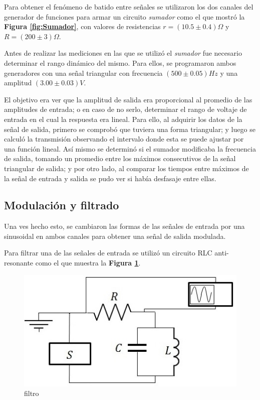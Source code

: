 \documentclass[11pt,a4paper]{article}
\begin{document}
Para obtener el fenómeno de batido entre señales se utilizaron los dos canales del generador de funciones para armar un circuito \textit{sumador} como el que mostró la \textbf{Figura \ref{fig:Sumador}}, con valores de resistencias $r=(10.5 \pm 0.4)\Omega$ y $R=(200 \pm 3)\Omega$.

Antes de realizar las mediciones en las que se utilizó el \textit{sumador} fue necesario determinar el rango dinámico del mismo. Para ellos, se programaron ambos generadores con una señal triangular con frecuencia $(500 \pm 0.05) Hz$ y una amplitud $(3.00 \pm 0.03)V$.

El objetivo era ver que la amplitud de salida era proporcional al promedio de las amplitudes de entrada; o en caso de no serlo, determinar el rango de voltaje de entrada en el cual la respuesta era lineal. Para ello, al adquirir los datos de la señal de salida, primero se comprobó que tuviera una forma triangular; y luego se calculó la transmisión observando el intervalo donde esta se puede ajustar por una función lineal. Así mismo se determinó si el sumador modificaba la frecuencia de salida, tomando un promedio entre los máximos consecutivos de la señal triangular de salida; y por otro lado, al comparar los tiempos entre máximos de la señal de entrada y salida se pudo ver si había desfasaje entre ellas. 

\newpage
\subsection{Modulación y filtrado}
Una ves hecho esto, se cambiaron las formas de las señales de entrada por una sinusoidal en ambos canales para obtener una señal de salida modulada.

Para filtrar una de las señales de entrada se utilizó un circuito RLC anti-resonante como el que muestra la \textbf{Figura \ref{fig:filtro}}. 

\begin{figure}[h]
\centering
\includegraphics[scale=0.65]{filtro}
\caption{filtro}
\label{fig:filtro}
\end{figure}
\end{document}
